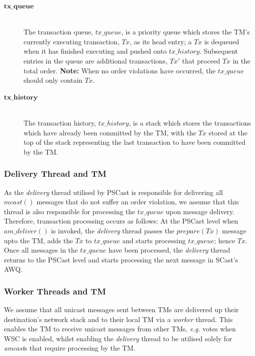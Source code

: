 \begin{description}
        \item[$\bm{tx\_queue}$] \hfill \\
        The transaction queue, $tx\_queue$, is a priority queue which stores the TM's currently executing transaction, $Tx$, as its head entry; a $Tx$ is dequeued when it has finished executing and pushed onto $tx\_history$.  Subsequent entries in the queue are additional transactions, $Tx'$ that proceed $Tx$ in the total order.  \textbf{Note:} When no order violations have occurred, the $tx\_queue$ should only contain $Tx$.  
        
        \item[$\bm{tx\_history}$] \hfill \\
        The transaction history, $tx\_history$, is a stack which stores the transactions which have already been committed by the TM, with the $Tx$ stored at the top of the stack representing the last transaction to have been committed by the TM.  
    \end{description}
    
    \subsubsection*{Delivery Thread and TM}
    As the \emph{delivery} thread utilised by \textsf{PSCast} is responsible for delivering all $mcast()$ messages that do not suffer an order violation, we assume that this thread is also responsible for processing the $tx\_queue$ upon message delivery.  Therefore, transaction processing occurs as follows: At the \textsf{PSCast} level when $am\_deliver()$ is invoked, the \emph{delivery} thread passes the $prepare(Tx)$ message upto the TM, adds the $Tx$ to $tx\_queue$ and starts processing $tx\_queue$; hence $Tx$.  Once all messages in the $tx\_queue$ have been processed, the \emph{delivery} thread returns to the \textsf{PSCast} level and starts processing the next message in \textsf{SCast}'s AWQ.
    
    \subsubsection*{Worker Threads and TM}
    We assume that all unicast messages sent between TMs are delivered up their destination's network stack and to their local TM via a \emph{worker} thread.  This enables the TM to receive unicast messages from other TMs, \emph{e.g.} votes when WSC is enabled, whilst enabling the \emph{delivery} thread to be utilised solely for \emph{amcast}s that require processing by the TM.  
       
